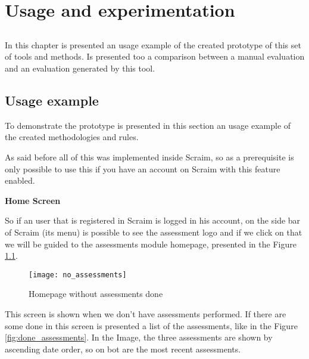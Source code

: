 \chapter{Usage and experimentation} \label{chap:usage}

\section*{}

In this chapter is presented an usage example of the created prototype of this set of tools and methods. Is presented too a comparison between a manual evaluation and an evaluation generated by this tool.

\section{Usage example} \label{sec:usageexample}

To demonstrate the prototype is presented in this section an usage example of the created methodologies and rules.

As said before all of this was implemented inside Scraim, so as a prerequisite is only possible to use this if you have an account on Scraim with this feature enabled.

\vspace{10 mm}

\textbf{Home Screen}

So if an user that is registered in Scraim is logged in his account, on the side bar of Scraim (its menu) is possible to see the assessment logo and if we click on that we will be guided to the assessments module homepage, presented in the Figure \ref{fig:no_assessments}.

\begin{figure}[!htb]
	\begin{center}
		\leavevmode
		\texttt{[image: no\_assessments]}
		\caption{Homepage without assessments done}
		\label{fig:no_assessments}
	\end{center}
\end{figure}

This screen is shown when we don't have assessments performed. If there are some done in this screen is presented a list of the assessments, like in the Figure \ref{fig:done_assessments}. In the Image, the three assessments are shown by ascending date order, so on bot are the most recent assessments.

